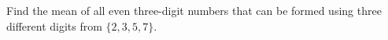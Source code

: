 Find the mean of all even three-digit numbers that can be formed using three different digits from $\{2,3,5,7\}$.
